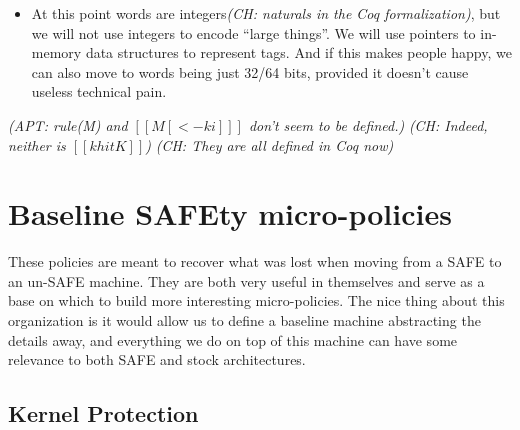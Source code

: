 \documentclass{article}
\newcommand{\ch}[1]{{\color{dkblue}\em (CH: #1)}}
\newcommand{\apt}[1]{{\color{red}\em (APT: #1)}}
\newcommand{\micro}{micro-}
\newcommand{\uPs}{\micro policies\xspace}
\begin{document}
\begin{itemize}
  \ch{Here is a bit more text from the PUMP paper; it makes it sound
    like this is really easy, but we know for us it was not: ``While
    the processor is in miss-handler mode, the PUMP applies a single,
    hardwired rule: all instructions and data touched by the miss
    handler must be tagged with a predefined miss-handler tag. This
    tagging provides isolation between the miss handler code and data
    and the user code in the same address space. This prevents user
    code from directly calling miss-handler code or manipulating
    miss-handler data structures.  Conversely, it prevents the miss
    handler from accidentally touching user data and code.''}

\item At this point words are integers\ch{naturals in the Coq
    formalization}, but we will not use integers to encode ``large
  things''. We will use pointers to in-memory data structures to
  represent tags. And if this makes people happy, we can also move to
  words being just 32/64 bits, provided it doesn't cause useless
  technical pain.

\end{itemize}


\medskip
\ottgrammartabular{\ottw\ottinterrule}

\ottgrammartabular{
\otta\ottinterrule
\otti\ottinterrule
\ottop\ottinterrule
\ottS\ottinterrule}

\ottgrammartabular{
\ottk\ottinterrule
\ottki\ottinterrule
\ottko\ottinterrule}

\ottdefncstep

\apt{rule(M) and $[[ M[<-ki] ]]$ don't seem to be defined.}
\ch{Indeed, neither is $[[k hit K]]$}
\ch{They are all defined in Coq now}

\section{Baseline SAFEty \uPs}

These policies are meant to recover what was lost when moving from a
SAFE to an un-SAFE machine. They are both very useful in themselves
and serve as a base on which to build more interesting \uPs.
%
The nice thing about this organization is it would allow us to define
a baseline machine abstracting the details away, and everything we do
on top of this machine can have some relevance to both SAFE and stock
architectures.

\subsection{Kernel Protection}
\label{sec:kernel}
\end{document}

